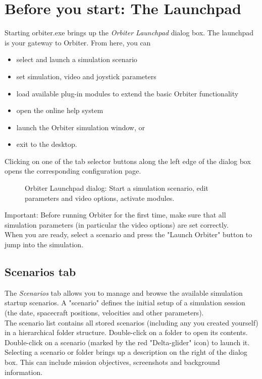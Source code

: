 \documentclass[Orbiter User Manual.tex]{subfiles}
\begin{document}
\section{Before you start: The Launchpad}
\label{sec:launchpad}
Starting orbiter.exe brings up the \textit{Orbiter Launchpad} dialog box. The launchpad is your gateway to Orbiter. From here, you can

\begin{itemize}
\item select and launch a simulation scenario
\item set simulation, video and joystick parameters
\item load available plug-in modules to extend the basic Orbiter functionality
\item open the online help system
\item launch the Orbiter simulation window, or
\item exit to the desktop.
\end{itemize}

\noindent
Clicking on one of the tab selector buttons along the left edge of the dialog box opens the corresponding configuration page.

\begin{figure}[H]
	\centering
	\caption{Orbiter Launchpad dialog: Start a simulation scenario, edit parameters and video options, activate modules.}
\end{figure}

\noindent
Important: Before running Orbiter for the first time, make sure that all simulation parameters (in particular the video options) are set correctly.\\
When you are ready, select a scenario and press the "Launch Orbiter" button to jump into the simulation.


\subsection{Scenarios tab}
\label{ssec:scenarios_tab}
The \textit{Scenarios} tab allows you to manage and browse the available simulation startup scenarios. A "scenario" defines the initial setup of a simulation session (the date, spacecraft positions, velocities and other parameters).\\
The scenario list contains all stored scenarios (including any you created yourself) in a hierarchical folder structure. Double-click on a folder to open its contents. Double-click on a scenario (marked by the red "Delta-glider" icon) to launch it.\\
Selecting a scenario or folder brings up a description on the right of the dialog box. This can include mission objectives, screenshots and background information.
\end{document}
